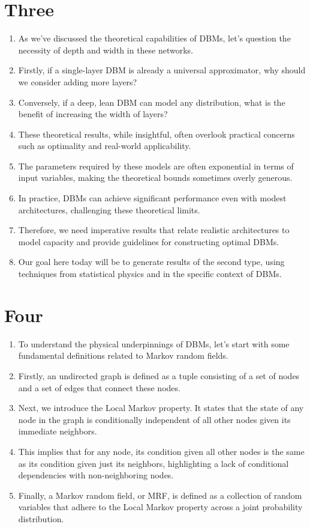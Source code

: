 \documentclass{article}
\begin{document}
\section*{Three}
\begin{enumerate}
    \item As we've discussed the theoretical capabilities of DBMs, let's question the necessity of depth and width in these networks.
    \item Firstly, if a single-layer DBM is already a universal approximator, why should we consider adding more layers?
    \item Conversely, if a deep, lean DBM can model any distribution, what is the benefit of increasing the width of layers?
    \item These theoretical results, while insightful, often overlook practical concerns such as optimality and real-world applicability.
    \item The parameters required by these models are often exponential in terms of input variables, making the theoretical bounds sometimes overly generous.
    \item In practice, DBMs can achieve significant performance even with modest architectures, challenging these theoretical limits.
    \item Therefore, we need imperative results that relate realistic architectures to model capacity and provide guidelines for constructing optimal DBMs.
    \item Our goal here today will be to generate results of the second type, using techniques from statistical physics and in the specific context of DBMs.
\end{enumerate}

\section*{Four}
\begin{enumerate}
    \item To understand the physical underpinnings of DBMs, let's start with some fundamental definitions related to Markov random fields.
    \item Firstly, an undirected graph is defined as a tuple consisting of a set of nodes and a set of edges that connect these nodes.
    \item Next, we introduce the Local Markov property. It states that the state of any node in the graph is conditionally independent of all other nodes given its immediate neighbors.
    \item This implies that for any node, its condition given all other nodes is the same as its condition given just its neighbors, highlighting a lack of conditional dependencies with non-neighboring nodes.
    \item Finally, a Markov random field, or MRF, is defined as a collection of random variables that adhere to the Local Markov property across a joint probability distribution.
\end{enumerate}
\end{document}
